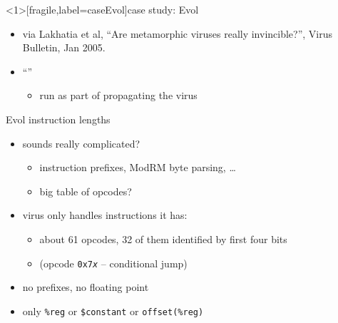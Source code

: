 \begin{frame}<1>[fragile,label=caseEvol]{case study: Evol}
    \begin{itemize}
    \item via Lakhatia et al, ``Are metamorphic viruses really invincible?'', Virus Bulletin, Jan 2005.
    \item ``''
        \begin{itemize}
        \item run as part of propagating the virus
        \end{itemize}
    \end{itemize}
\end{frame}


\begin{frame}{Evol instruction lengths}
    \begin{itemize}
    \item sounds really complicated?
        \begin{itemize}
        \item instruction prefixes, ModRM byte parsing, \ldots
        \item big table of opcodes?
        \end{itemize}
    \item virus only handles instructions it has:
        \begin{itemize}
        \item about 61 opcodes, 32 of them identified by first four bits
        \item (opcode {\tt 0x7\textit{x}} -- conditional jump)
        \end{itemize}
    \item no prefixes, no floating point
    \item only {\tt \%reg} or {\tt \$constant} or {\tt offset(\%reg)}
    \end{itemize}
\end{frame}

